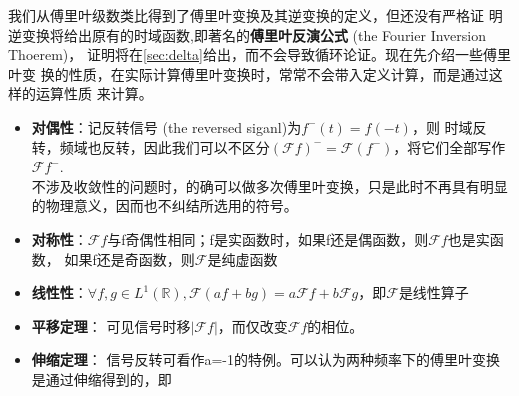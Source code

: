 \documentclass{ctexbook}
\begin{document}
我们从傅里叶级数类比得到了傅里叶变换及其逆变换的定义，但还没有严格证
明逆变换将给出原有的时域函数,即著名的\textbf{傅里叶反演公式} (the Fourier Inversion Thoerem)，
证明将在\ref{sec:delta}给出，而不会导致循环论证。现在先介绍一些傅里叶变
换的性质，在实际计算傅里叶变换时，常常不会带入定义计算，而是通过这样的运算性质
来计算。
{\nolinebreak[4]
\begin{itemize}
    \item \textbf{对偶性}：记反转信号 (the reversed siganl)为$f^-(t)=f(-t)$，则
          时域反转，频域也反转，因此我们可以不区分$(\mathcal{F}f)^-=\mathcal{F} (f^-)$，将它们全部写作$\mathcal{F} f^-$.\\
          不涉及收敛性的问题时，的确可以做多次傅里叶变换，只是此时不再具有明显的物理意义，因而也不纠结所选用的符号。
    \item \textbf{对称性}：$\mathcal{F} f$与f奇偶性相同；f是实函数时，如果f还是偶函数，则$\mathcal{F} f$也是实函数，
          如果f还是奇函数，则$\mathcal{F} $是纯虚函数
    \item \textbf{线性性}：$\forall f,g\in L^1(\mathbb{R}),\mathcal{F} (af+bg)=a\mathcal{F} f+b\mathcal{F} g$，即$\mathcal{F} $是线性算子
    \item \textbf{平移定理}：
          可见信号时移$|\mathcal{F} f|$，而仅改变$\mathcal{F} f$的相位。
    \item \textbf{伸缩定理}：
          信号反转可看作a=-1的特例。可以认为两种频率下的傅里叶变换是通过伸缩得到的，即

\end{itemize}}
\end{document}
